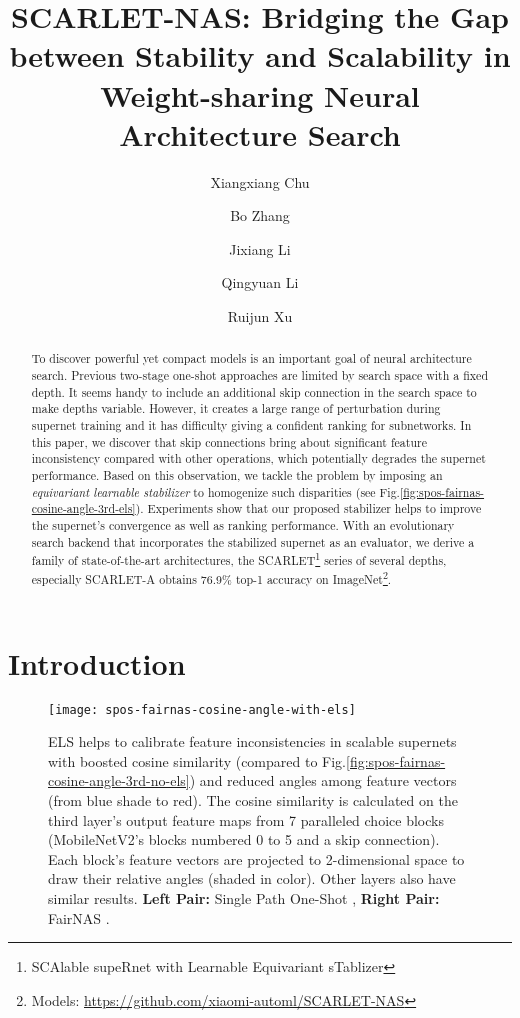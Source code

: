 \documentclass[runningheads]{llncs}
\begin{document}
\title{SCARLET-NAS: Bridging the Gap between Stability and Scalability in Weight-sharing Neural Architecture Search} 
\author{Xiangxiang Chu \and
Bo Zhang \and
Jixiang Li \and
Qingyuan Li \and
Ruijun Xu}
 \maketitle              \begin{abstract} To discover powerful yet compact models is an important goal of neural architecture search. Previous two-stage one-shot approaches are limited by search space with a fixed depth. It seems handy to include an additional skip connection in the search space to make depths variable. However, it creates a large range of perturbation during supernet training and it has difficulty giving a confident ranking for subnetworks. In this paper, we discover that skip connections bring about significant feature inconsistency compared with other operations, which potentially degrades the supernet performance. Based on this observation, we tackle the problem by imposing an \emph{equivariant learnable stabilizer} to homogenize such disparities (see Fig.\ref{fig:spos-fairnas-cosine-angle-3rd-els}).  Experiments show that our proposed stabilizer helps to improve the supernet's convergence as well as ranking performance. With an evolutionary search backend that incorporates the stabilized supernet as an evaluator, we derive a family of state-of-the-art architectures, the SCARLET\footnote{SCAlable supeRnet with Learnable Equivariant sTablizer} series of several depths, especially SCARLET-A obtains 76.9\% top-1 accuracy on ImageNet\footnote{Models: \url{https://github.com/xiaomi-automl/SCARLET-NAS}}. 

\end{abstract}
\section{Introduction}

\begin{figure}[ht]
	\centering
	\texttt{[image: spos-fairnas-cosine-angle-with-els]}
	\caption{ELS helps to calibrate feature inconsistencies in scalable supernets with boosted cosine similarity (compared to Fig.\ref{fig:spos-fairnas-cosine-angle-3rd-no-els}) and reduced angles among feature vectors (from blue shade to red). The cosine similarity is calculated on the third layer's output feature maps from 7 paralleled choice blocks (MobileNetV2's blocks numbered 0 to 5 and a skip connection). Each block's feature vectors are projected to 2-dimensional space  to draw  their relative angles (shaded in color). Other layers also have similar results. \textbf{Left Pair:} Single Path One-Shot \protect\cite{guo2019single}, \textbf{Right Pair:} FairNAS \protect\cite{chu2019fairnas}.}
	\label{fig:spos-fairnas-cosine-angle-3rd-els}
\end{figure} 
\end{document}
